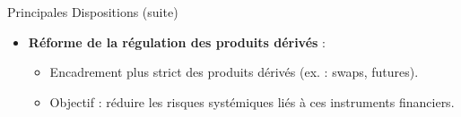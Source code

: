 \begin{frame}{Principales Dispositions (suite)}
    \begin{itemize}
        \item \textbf{Réforme de la régulation des produits dérivés} :
            \begin{itemize}
                \item Encadrement plus strict des produits dérivés (ex. : swaps, futures).
                \item Objectif : réduire les risques systémiques liés à ces instruments financiers.
            \end{itemize}
    \end{itemize}
\end{frame}